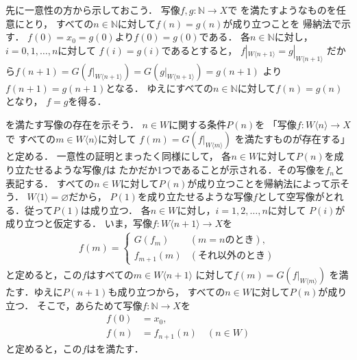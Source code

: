 \documentclass[11pt,a4paper]{ltjsarticle} %
\makeatletter
\theoremstyle{mystyle} %
\renewenvironment{proof}[1][\proofname]{\par
  \pushQED{\qed}%
  \normalfont \topsep6\p@\@plus6\p@\relax
  \trivlist
\item[\hskip\labelsep
  \itshape
  #1]\ignorespaces%
  }{%
  \popQED\endtrivlist\@endpefalse
}
\renewcommand{\proofname}{\textbf{［証明］}}
\makeatother
\begin{document}
\begin{proof}
	先に一意性の方から示しておこう．
	写像$f,g \colon \mathbb{N} \longrightarrow X$で
	を満たすようなものを任意にとり，
	すべての$n \in \mathbb{N}$に対して$f(n) = g(n)$が成り立つことを
	帰納法で示す．
	$f(0) = x_0 = g(0)$より$f(0)=g(0)$である．
	各$n \in \mathbb{N}$に対し，$i= 0,1, \ldots, n$に対して
	$f(i)=g(i)$であるとすると，
	$f|_{W \langle n+1 \rangle} = g|_{W \langle n+1 \rangle} $
	だから$f(n+1) = G \left( f|_{W \langle n+1 \rangle} \right) =
		G \left ( g |_{W \langle n+1 \rangle} \right) = g(n+1)$
	より$f(n+1) =g(n+1)$となる．
	ゆえにすべての$n \in \mathbb{N}$に対して$f(n) = g(n)$となり，
	$f=g$を得る．

	を満たす写像の存在を示そう．
	$n \in W$に関する条件$P(n)$を
	「写像$f \colon W \langle n \rangle \longrightarrow X$で
	すべての$m \in W \langle n \rangle$に対して
	$f(m) = G \left( f|_{W \langle m \rangle } \right)$
	を満たすものが存在する」と定める．
	一意性の証明とまったく同様にして，
	各$n \in W$に対して$P(n)$を成り立たせるような写像$f$は
	たかだか1つであることが示される．その写像を$f_n$と表記する．
	すべての$n \in W$に対して$P(n)$が成り立つことを帰納法によって示そう．
	$W \langle 1 \rangle = \varnothing$だから，
	$P(1)$を成り立たせるような写像$f$として空写像がとれる．従って$P(1)$は成り立つ．
	各$n \in W$に対し，$i=1,2,\ldots,n$に対して
	$P(i)$が成り立つと仮定する．
	いま，写像$f \colon W \langle n+1 \rangle \longrightarrow X$を
	\begin{align*}
		f (m) =
		\begin{cases}
			G \left( f_{m} \right) & ( \text{$m=n$のとき} ) , \\
			f_{m+1} (m)            & (\text{それ以外のとき})
		\end{cases}
	\end{align*}
	と定めると，この$f$はすべての$m \in W \langle n+1 \rangle$
	に対して$f(m) = G \left( f|_{W \langle m \rangle} \right)$
	を満たす．ゆえに$P(n+1)$も成り立つから，
	すべての$n \in W$に対して$P(n)$が成り立つ．
	そこで，あらためて写像$f \colon \mathbb{N} \longrightarrow X$を
	\begin{align*}
		f(0) & = x_0 ,                        \\
		f(n) & = f_{n+1} (n) \quad ( n \in W)
	\end{align*}
	と定めると，この$f$はを満たす．
\end{proof}
\end{document}
